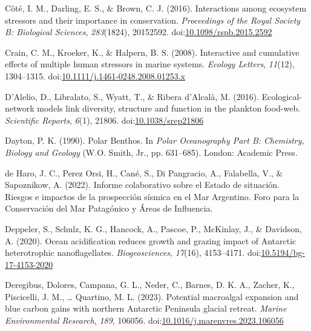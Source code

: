 \documentclass[
]{article}
\newlength{\cslhangindent}
\newlength{\cslentryspacingunit} %
\newenvironment{CSLReferences}[2] %
 {%
  \setlength{\parindent}{0pt}
  \ifodd #1
  \let\oldpar\par
  \def\par{\hangindent=\cslhangindent\oldpar}
  \fi
  \setlength{\parskip}{#2\cslentryspacingunit}
 }%
 {}
\begin{document}
\begin{CSLReferences}{1}{0}
\leavevmode{}%
Côté, I. M., Darling, E. S., \& Brown, C. J. (2016). Interactions among
ecosystem stressors and their importance in conservation.
\emph{Proceedings of the Royal Society B: Biological Sciences},
\emph{283}(1824), 20152592.
doi:\href{https://doi.org/10.1098/rspb.2015.2592}{10.1098/rspb.2015.2592}

\leavevmode{}%
Crain, C. M., Kroeker, K., \& Halpern, B. S. (2008). Interactive and
cumulative effects of multiple human stressors in marine systems.
\emph{Ecology Letters}, \emph{11}(12), 1304--1315.
doi:\href{https://doi.org/10.1111/j.1461-0248.2008.01253.x}{10.1111/j.1461-0248.2008.01253.x}

\leavevmode{}%
D'Alelio, D., Libralato, S., Wyatt, T., \& Ribera d'Alcalà, M. (2016).
Ecological-network models link diversity, structure and function in the
plankton food-web. \emph{Scientific Reports}, \emph{6}(1), 21806.
doi:\href{https://doi.org/10.1038/srep21806}{10.1038/srep21806}

\leavevmode{}%
Dayton, P. K. (1990). Polar {Benthos}. In \emph{Polar {Oceanography Part
B}: {Chemistry}, {Biology} and {Geology}} (W.O. Smith, Jr., pp.
631--685). {London}: {Academic Press}.

\leavevmode{}%
de Haro, J. C., Perez Orsi, H., Cané, S., Di Pangracio, A., Falabella,
V., \& Sapoznikow, A. (2022). {Informe colaborativo sobre el Estado de
situación. Riesgos e impactos de la prospección sísmica en el Mar
Argentino}. {Foro para la Conservación del Mar Patagónico y Áreas de
Influencia}.

\leavevmode{}%
Deppeler, S., Schulz, K. G., Hancock, A., Pascoe, P., McKinlay, J., \&
Davidson, A. (2020). Ocean acidification reduces growth and grazing
impact of {Antarctic} heterotrophic nanoflagellates.
\emph{Biogeosciences}, \emph{17}(16), 4153--4171.
doi:\href{https://doi.org/10.5194/bg-17-4153-2020}{10.5194/bg-17-4153-2020}

\leavevmode{}%
Deregibus, Dolores, Campana, G. L., Neder, C., Barnes, D. K. A., Zacher,
K., Piscicelli, J. M., \ldots{} Quartino, M. L. (2023). Potential
macroalgal expansion and blue carbon gains with northern {Antarctic
Peninsula} glacial retreat. \emph{Marine Environmental Research},
\emph{189}, 106056.
doi:\href{https://doi.org/10.1016/j.marenvres.2023.106056}{10.1016/j.marenvres.2023.106056}


\end{CSLReferences}
\end{document}
